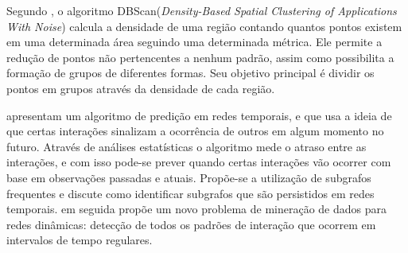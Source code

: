 Segundo \cite{density-based-clusters}, o algoritmo DBScan(\textit{Density-Based Spatial Clustering
of Applications With Noise}) calcula a densidade de uma região contando quantos pontos existem
em uma determinada área seguindo uma determinada métrica. Ele permite a redução de pontos não
pertencentes a nenhum padrão, assim como possibilita a formação de grupos de diferentes formas.
Seu objetivo principal é dividir os pontos em grupos através da densidade de cada região.

\cite{lahiri2007} apresentam um algoritmo de predição em redes temporais, e que usa a ideia de que certas
interações sinalizam a ocorrência de outros em algum momento no futuro. Através de análises estatísticas
o algoritmo mede o atraso entre as interações, e com isso pode-se prever quando certas interações vão ocorrer
com base em observações passadas e atuais. Propõe-se a utilização de subgrafos frequentes e discute
como identificar subgrafos que são persistidos em redes temporais.
\cite{lahiri2008} em seguida propõe um novo problema de mineração de dados para redes dinâmicas:
detecção de todos os padrões de interação que ocorrem em intervalos de tempo regulares.












